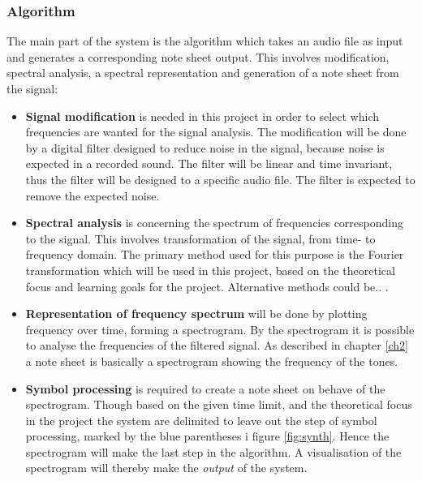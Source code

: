 \subsubsection{Algorithm}
The main part of the system is the algorithm which takes an audio file as input and generates a corresponding note sheet output. This involves modification, spectral analysis, a spectral representation and generation of a note sheet from the signal:
\begin{itemize}
\item[] \textbf{Signal modification} is needed in this project in order to select which frequencies are wanted for the signal analysis. The modification will be done by a digital filter designed to reduce noise in the signal, because noise is expected in a recorded sound. The filter will be linear and time invariant, thus the filter will be designed to a specific audio file. The filter is expected to remove the expected noise.              
\item[] \textbf{Spectral analysis} is concerning the spectrum of frequencies corresponding to the signal. This involves transformation of the signal, from time- to frequency domain.     
The primary method used for this purpose is the Fourier transformation which will be used in this project, based on the theoretical focus and learning goals for the project. Alternative methods could be.. .
\item[] \textbf{Representation of frequency spectrum} will be done by plotting frequency over time, forming a spectrogram. By the spectrogram it is possible to analyse the frequencies of the filtered signal. As described in chapter \ref{ch2} a note sheet is basically a spectrogram showing the frequency of the tones.
\item[] \textbf{Symbol processing} is required to create a note sheet on behave of the spectrogram. 
Though based on the given time limit, and the theoretical focus in the project the system are delimited to leave out the step of symbol processing, marked by the blue parentheses i figure \ref{fig:synth}. Hence the spectrogram will make the last step in the algorithm.
A visualisation of the spectrogram will thereby make the \textit{output} of the system.   
\end{itemize}

